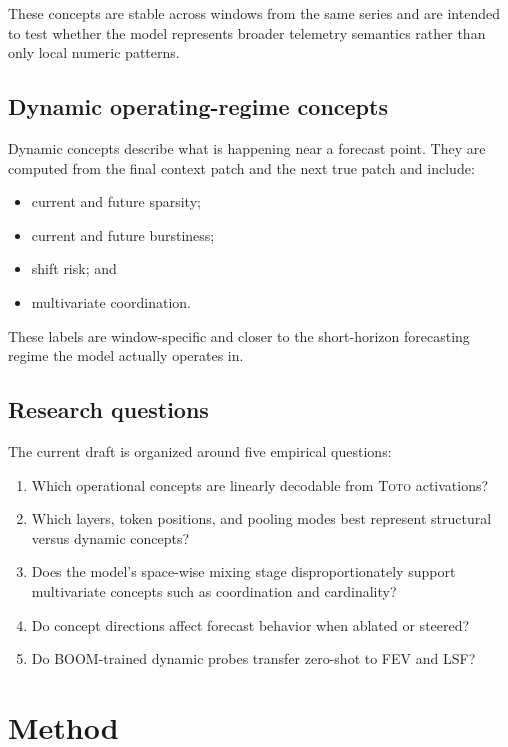 \documentclass{article}
\newcommand{\model}{\textsc{Toto}}
\newcommand{\boom}{\textsc{BOOM}}
\newcommand{\fev}{\textsc{FEV}}
\newcommand{\lsf}{\textsc{LSF}}
\begin{document}
These concepts are stable across windows from the same series and are intended to test whether the model represents broader telemetry semantics rather than only local numeric patterns.

\subsection{Dynamic operating-regime concepts}

Dynamic concepts describe what is happening near a forecast point. They are computed from the final context patch and the next true patch and include:
\begin{itemize}[leftmargin=18pt]
\item current and future sparsity;
\item current and future burstiness;
\item shift risk; and
\item multivariate coordination.
\end{itemize}

These labels are window-specific and closer to the short-horizon forecasting regime the model actually operates in.

\subsection{Research questions}

The current draft is organized around five empirical questions:
\begin{enumerate}[leftmargin=18pt]
\item Which operational concepts are linearly decodable from \model{} activations?
\item Which layers, token positions, and pooling modes best represent structural versus dynamic concepts?
\item Does the model's space-wise mixing stage disproportionately support multivariate concepts such as coordination and cardinality?
\item Do concept directions affect forecast behavior when ablated or steered?
\item Do \boom{}-trained dynamic probes transfer zero-shot to \fev{} and \lsf{}?
\end{enumerate}

\section{Method}
\label{sec:method}
\end{document}

